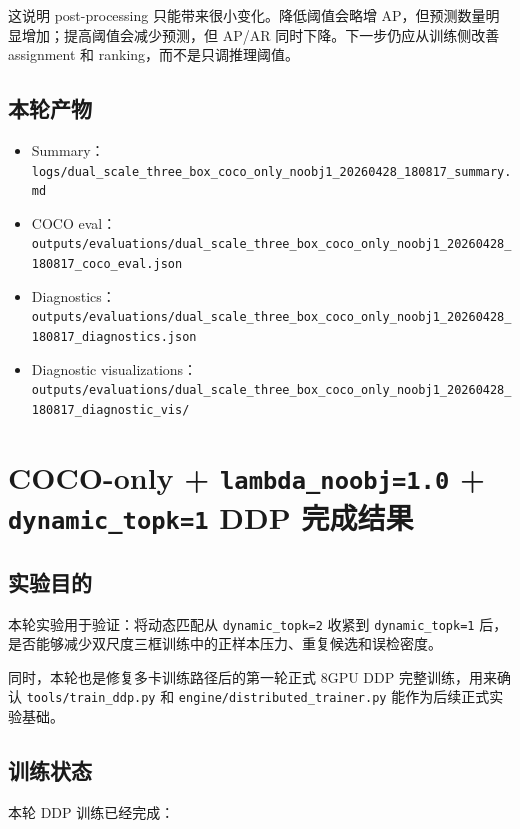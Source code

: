 \documentclass[UTF8]{ctexart}
\begin{document}
这说明 post-processing 只能带来很小变化。降低阈值会略增 AP，但预测数量明显增加；提高阈值会减少预测，但 AP/AR 同时下降。下一步仍应从训练侧改善 assignment 和 ranking，而不是只调推理阈值。

\subsection{本轮产物}

\begin{itemize}[leftmargin=2em]
  \item Summary：\texttt{logs/dual\_scale\_three\_box\_coco\_only\_noobj1\_20260428\_180817\_summary.md}
  \item COCO eval：\texttt{outputs/evaluations/dual\_scale\_three\_box\_coco\_only\_noobj1\_20260428\_180817\_coco\_eval.json}
  \item Diagnostics：\texttt{outputs/evaluations/dual\_scale\_three\_box\_coco\_only\_noobj1\_20260428\_180817\_diagnostics.json}
  \item Diagnostic visualizations：\texttt{outputs/evaluations/dual\_scale\_three\_box\_coco\_only\_noobj1\_20260428\_180817\_diagnostic\_vis/}
\end{itemize}

\section{COCO-only + \texttt{lambda\_noobj=1.0} + \texttt{dynamic\_topk=1} DDP 完成结果}

\subsection{实验目的}

本轮实验用于验证：将动态匹配从 \texttt{dynamic\_topk=2} 收紧到 \texttt{dynamic\_topk=1} 后，是否能够减少双尺度三框训练中的正样本压力、重复候选和误检密度。

同时，本轮也是修复多卡训练路径后的第一轮正式 8GPU DDP 完整训练，用来确认 \texttt{tools/train\_ddp.py} 和 \texttt{engine/distributed\_trainer.py} 能作为后续正式实验基础。

\subsection{训练状态}

本轮 DDP 训练已经完成：
\end{document}
